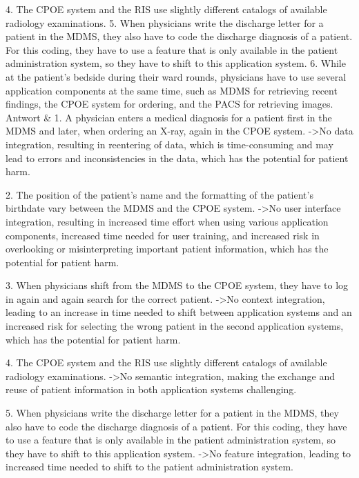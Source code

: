 4. The CPOE system and the RIS use slightly different catalogs of available radiology examinations.
5. When physicians write the discharge letter for a patient in the MDMS, they also have to code the discharge diagnosis of a patient. For this coding, they have to use a feature that is only available in the patient administration system, so they have to shift to this application system.
6. While at the patient's bedside during their ward rounds, physicians have to use several application components at the same time, such as MDMS for retrieving recent findings, the CPOE system for ordering, and the PACS for retrieving images. \\
Antwort & 1. A physician enters a medical diagnosis for a patient first in the MDMS and later, when ordering an X-ray, again in the CPOE system. -\textgreater No data integration, resulting in reentering of data, which is time-consuming and may lead to errors and inconsistencies in the data, which has the potential for patient harm.
 
2. The position of the patient's name and the formatting of the patient's birthdate vary between the MDMS and the CPOE system. -\textgreater No user interface integration, resulting in increased time effort when using various application components, increased time needed for user training, and increased risk in overlooking or misinterpreting important patient information, which has the potential for patient harm.
 
3. When physicians shift from the MDMS to the CPOE system, they have to log in again and again search for the correct patient. -\textgreater No context integration, leading to an increase in time needed to shift between application systems and an increased risk for selecting the wrong patient in the second application systems, which has the potential for patient harm.
 
4. The CPOE system and the RIS use slightly different catalogs of available radiology examinations. -\textgreater No semantic integration, making the exchange and reuse of patient information in both application systems challenging.
 
5. When physicians write the discharge letter for a patient in the MDMS, they also have to code the discharge diagnosis of a patient. For this coding, they have to use a feature that is only available in the patient administration system, so they have to shift to this application system. -\textgreater No feature integration, leading to increased time needed to shift to the patient administration system.
 
